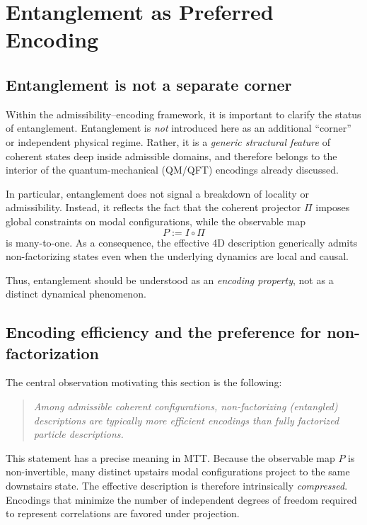 \documentclass[11pt]{article}
\begin{document}
\section{Entanglement as Preferred Encoding}
\label{sec:entanglement_encoding}

\subsection{Entanglement is not a separate corner}
\label{sec:ent_not_corner}

Within the admissibility–encoding framework, it is important to clarify the status of
entanglement. Entanglement is \emph{not} introduced here as an additional ``corner'' or
independent physical regime. Rather, it is a \emph{generic structural feature} of coherent
states deep inside admissible domains, and therefore belongs to the interior of the
quantum-mechanical (QM/QFT) encodings already discussed.

In particular, entanglement does not signal a breakdown of locality or admissibility.
Instead, it reflects the fact that the coherent projector $\Pi$ imposes global constraints
on modal configurations, while the observable map
\begin{equation}
P := I \circ \Pi
\end{equation}
is many-to-one. As a consequence, the effective 4D description generically admits
non-factorizing states even when the underlying dynamics are local and causal.

Thus, entanglement should be understood as an \emph{encoding property}, not as a distinct
dynamical phenomenon.

\subsection{Encoding efficiency and the preference for non-factorization}
\label{sec:encoding_efficiency}

The central observation motivating this section is the following:

\begin{quote}
\emph{Among admissible coherent configurations, non-factorizing (entangled) descriptions are
typically more efficient encodings than fully factorized particle descriptions.}
\end{quote}

This statement has a precise meaning in MTT. Because the observable map $P$ is non-invertible,
many distinct upstairs modal configurations project to the same downstairs state. The
effective description is therefore intrinsically \emph{compressed}. Encodings that minimize
the number of independent degrees of freedom required to represent correlations are favored
under projection.
\end{document}
